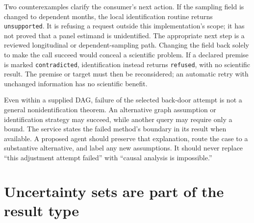 Two counterexamples clarify the consumer's next action. If the sampling field
is changed to dependent months, the local identification routine returns
\texttt{unsupported}. It is refusing a request outside this implementation's
scope; it has not proved that a panel estimand is unidentified. The appropriate
next step is a reviewed longitudinal or dependent-sampling path. Changing the
field back solely to make the call succeed would conceal a scientific problem.
If a declared premise is marked \texttt{contradicted}, identification instead
returns \texttt{refused}, with no scientific result. The premise or target
must then be reconsidered; an automatic retry with unchanged information has
no scientific benefit.

Even within a supplied DAG, failure of the selected back-door attempt is not
a general nonidentification theorem. An alternative graph assumption or
identification strategy may succeed, while another query may require only a
bound. The service states the failed method's boundary in its result when
available. A proposed agent should preserve that explanation, route the case
to a substantive alternative, and label any new assumptions. It should never
replace ``this adjustment attempt failed'' with ``causal analysis is
impossible.''

\section{Uncertainty sets are part of the result type}

